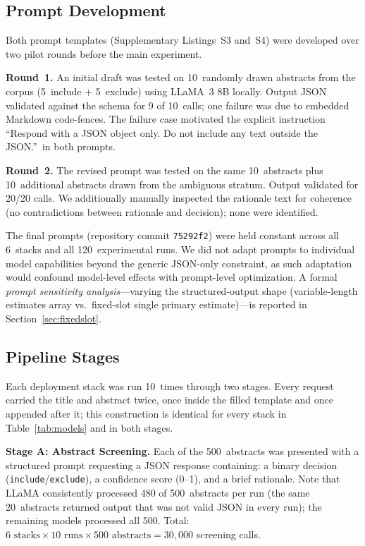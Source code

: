\documentclass[preprint,review,12pt,authoryear]{elsarticle}
\begin{document}
\subsection{Prompt Development}
\label{sec:prompts}

Both prompt templates (Supplementary Listings~S3 and~S4) were developed over two pilot rounds before the main experiment.

\textbf{Round~1.}
An initial draft was tested on 10~randomly drawn abstracts from the corpus (5~include + 5~exclude) using LLaMA~3 8B locally.
Output JSON validated against the schema for 9 of 10~calls; one failure was due to embedded Markdown code-fences.
The failure case motivated the explicit instruction ``Respond with a JSON object only. Do not include any text outside the JSON.''~in both prompts.

\textbf{Round~2.}
The revised prompt was tested on the same 10~abstracts plus 10~additional abstracts drawn from the ambiguous stratum.
Output validated for 20/20 calls.
We additionally manually inspected the rationale text for coherence (no contradictions between rationale and decision); none were identified.

The final prompts (repository commit \texttt{75292f2}) were held constant across all 6~stacks and all 120~experimental runs.
We did not adapt prompts to individual model capabilities beyond the generic JSON-only constraint, as such adaptation would confound model-level effects with prompt-level optimization.
A formal \emph{prompt sensitivity analysis}---varying the structured-output shape (variable-length estimates array vs.\ fixed-slot single primary estimate)---is reported in Section~\ref{sec:fixedslot}.

\subsection{Pipeline Stages}

Each deployment stack was run 10~times through two stages. Every request carried the title and abstract twice, once inside the filled template and once appended after it; this construction is identical for every stack in Table~\ref{tab:models} and in both stages.

\textbf{Stage A: Abstract Screening.}
Each of the 500~abstracts was presented with a structured prompt requesting a JSON response containing: a binary decision (\texttt{include}/\texttt{exclude}), a confidence score (0--1), and a brief rationale.
Note that LLaMA consistently processed 480 of 500~abstracts per run (the same 20~abstracts returned output that was not valid JSON in every run); the remaining models processed all 500.
Total: $6 \text{ stacks} \times 10 \text{ runs} \times 500 \text{ abstracts} = 30{,}000$ screening calls.
\end{document}
